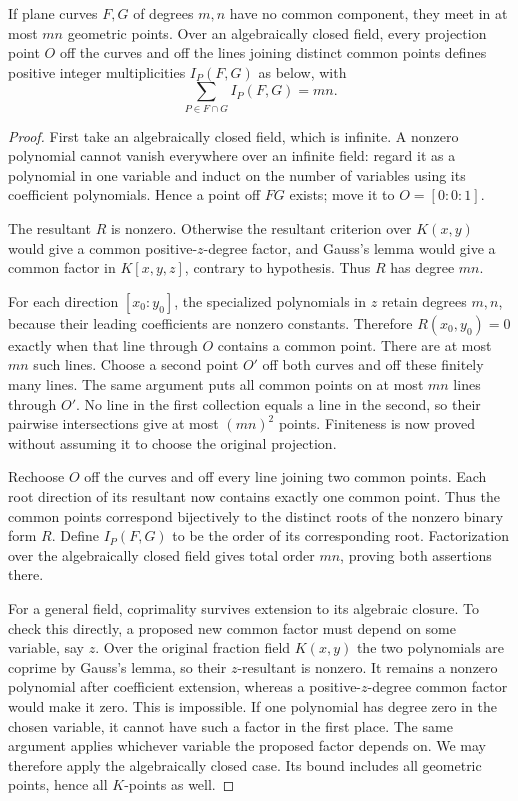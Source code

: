 \begin{theorem}\label{geometry:thm:bezout}
If plane curves $F,G$ of degrees $m,n$ have no common component, they meet in at most $mn$ geometric points. Over an algebraically closed field, every projection point $O$ off the curves and off the lines joining distinct common points defines positive integer multiplicities $I_P(F,G)$ as below, with
\[
\sum_{P\in F\cap G}I_P(F,G)=mn.
\]
\end{theorem}
\begin{proof}
First take an algebraically closed field, which is infinite. A nonzero polynomial cannot vanish everywhere over an infinite field: regard it as a polynomial in one variable and induct on the number of variables using its coefficient polynomials. Hence a point off $FG$ exists; move it to $O=[0:0:1]$.

The resultant $R$ is nonzero. Otherwise the resultant criterion over $K(x,y)$ would give a common positive-$z$-degree factor, and Gauss's lemma would give a common factor in $K[x,y,z]$, contrary to hypothesis. Thus $R$ has degree $mn$.

For each direction $[x_0:y_0]$, the specialized polynomials in $z$ retain degrees $m,n$, because their leading coefficients are nonzero constants. Therefore $R(x_0,y_0)=0$ exactly when that line through $O$ contains a common point. There are at most $mn$ such lines. Choose a second point $O'$ off both curves and off these finitely many lines. The same argument puts all common points on at most $mn$ lines through $O'$. No line in the first collection equals a line in the second, so their pairwise intersections give at most $(mn)^2$ points. Finiteness is now proved without assuming it to choose the original projection.

Rechoose $O$ off the curves and off every line joining two common points. Each root direction of its resultant now contains exactly one common point. Thus the common points correspond bijectively to the distinct roots of the nonzero binary form $R$. Define $I_P(F,G)$ to be the order of its corresponding root. Factorization over the algebraically closed field gives total order $mn$, proving both assertions there.

For a general field, coprimality survives extension to its algebraic closure. To check this directly, a proposed new common factor must depend on some variable, say $z$. Over the original fraction field $K(x,y)$ the two polynomials are coprime by Gauss's lemma, so their $z$-resultant is nonzero. It remains a nonzero polynomial after coefficient extension, whereas a positive-$z$-degree common factor would make it zero. This is impossible. If one polynomial has degree zero in the chosen variable, it cannot have such a factor in the first place. The same argument applies whichever variable the proposed factor depends on. We may therefore apply the algebraically closed case. Its bound includes all geometric points, hence all $K$-points as well.
\end{proof}

